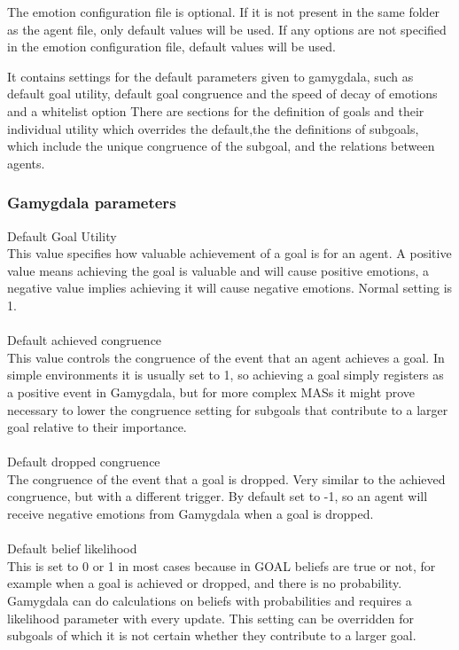 \documentclass[11pt]{article}
\begin{document}
The emotion configuration file is optional. If it is not present in the same folder as the agent file, only default values will be used. If any options are not specified in the emotion configuration file, default values will be used.

It contains settings for the default parameters given to gamygdala, such as default goal utility, default goal congruence and the speed of decay of emotions and a whitelist option There are sections for the definition of goals and their individual utility which overrides the default,the the definitions of subgoals, which include the unique congruence of the subgoal, and the relations between agents.

\subsubsection{Gamygdala parameters}
Default Goal Utility\\
This value specifies how valuable achievement of a goal is for an agent. A positive value means achieving the goal is valuable and will cause positive emotions, a negative value implies achieving it will cause negative emotions. Normal setting is 1.\\
\\
Default achieved congruence\\
This value controls the congruence of the event that an agent achieves a goal. In simple environments it is usually set to 1, so achieving a goal simply registers as a positive event in Gamygdala, but for more complex MASs it might prove necessary to lower the congruence setting for subgoals that contribute to a larger goal relative to their importance.\\
\\
Default dropped congruence\\
The congruence of the event that a goal is dropped. Very similar to the achieved congruence, but with a different trigger. By default set to -1, so an agent will receive negative emotions from Gamygdala when a goal is dropped.\\
\\
Default belief likelihood\\
This is set to 0 or 1 in most cases because in GOAL beliefs are true or not, for example when a goal is achieved or dropped, and there is no probability. Gamygdala can do calculations on beliefs with probabilities and requires a likelihood parameter with every update. This setting can be overridden for subgoals of which it is not certain whether they contribute to a larger goal.\\
\\
\end{document}
